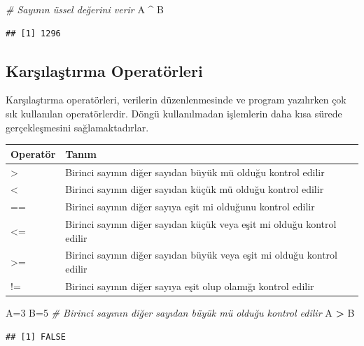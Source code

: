 \documentclass[
]{book}
\newenvironment{Shaded}{\begin{snugshade}}{\end{snugshade}}
\newcommand{\CommentTok}[1]{\textcolor[rgb]{0.56,0.35,0.01}{\textit{#1}}}
\newcommand{\DecValTok}[1]{\textcolor[rgb]{0.00,0.00,0.81}{#1}}
\newcommand{\NormalTok}[1]{#1}
\newcommand{\OtherTok}[1]{\textcolor[rgb]{0.56,0.35,0.01}{#1}}
\newcommand{\SpecialCharTok}[1]{\textcolor[rgb]{0.81,0.36,0.00}{\textbf{#1}}}
\begin{document}
\begin{Shaded}
\begin{Highlighting}[]
\CommentTok{\# Sayının üssel değerini verir}
\NormalTok{A }\SpecialCharTok{\^{}}\NormalTok{ B}
\end{Highlighting}
\end{Shaded}

\begin{verbatim}
## [1] 1296
\end{verbatim}

\subsection{Karşılaştırma Operatörleri}\label{karux15fux131laux15ftux131rma-operatuxf6rleri}

Karşılaştırma operatörleri, verilerin düzenlenmesinde ve program yazılırken çok sık kullanılan operatörlerdir. Döngü kullanılmadan işlemlerin daha kısa sürede gerçekleşmesini sağlamaktadırlar.

\begin{tabular}{ll}
\toprule
Operatör & Tanım\\
\midrule
> & Birinci sayının diğer sayıdan büyük mü olduğu kontrol edilir\\
< & Birinci sayının diğer sayıdan küçük mü olduğu kontrol edilir\\
== & Birinci sayının diğer sayıya eşit mi olduğunu kontrol edilir\\
<= & Birinci sayının diğer sayıdan küçük veya eşit mi olduğu kontrol edilir\\
>= & Birinci sayının diğer sayıdan büyük veya eşit mi olduğu kontrol edilir\\
\addlinespace
!= & Birinci sayının diğer sayıya eşit olup olamığı kontrol edilir\\
\bottomrule
\end{tabular}

\begin{Shaded}
\begin{Highlighting}[]
\NormalTok{A}\OtherTok{=}\DecValTok{3}
\NormalTok{B}\OtherTok{=}\DecValTok{5}
\CommentTok{\# Birinci sayının diğer sayıdan büyük mü olduğu kontrol edilir}
\NormalTok{A }\SpecialCharTok{\textgreater{}}\NormalTok{ B}
\end{Highlighting}
\end{Shaded}

\begin{verbatim}
## [1] FALSE
\end{verbatim}
\end{document}
